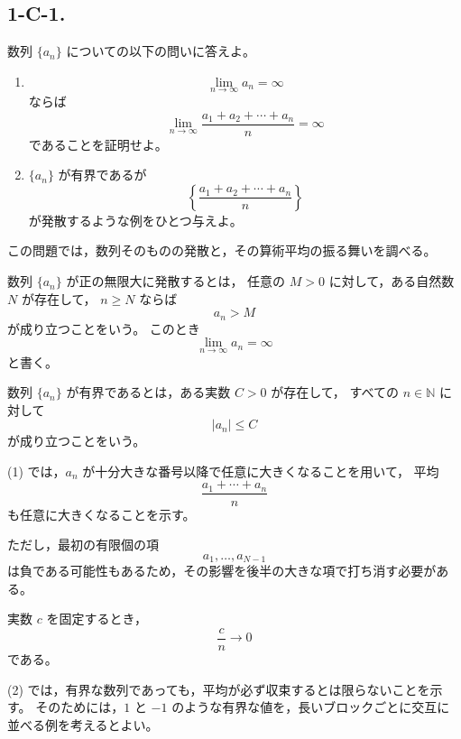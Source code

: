 \subsection{1-C-1.}
\begin{exercise}
    数列 $\{a_n\}$ についての以下の問いに答えよ。

    \begin{enumerate}
        \item
        \[
            \lim_{n\to\infty} a_n=\infty
        \]
        ならば
        \[
            \lim_{n\to\infty}
            \frac{a_1+a_2+\cdots+a_n}{n}
            =\infty
        \]
        であることを証明せよ。

        \item
        $\{a_n\}$ が有界であるが
        \[
            \left\{
                \frac{a_1+a_2+\cdots+a_n}{n}
            \right\}
        \]
        が発散するような例をひとつ与えよ。
    \end{enumerate}
\end{exercise}
\begin{background}
    この問題では，数列そのものの発散と，その算術平均の振る舞いを調べる。

    \begin{definition}[正の無限大への発散]
        数列 $\{a_n\}$ が正の無限大に発散するとは，
        任意の $M>0$ に対して，ある自然数 $N$ が存在して，
        $n\geq N$ ならば
        \[
            a_n>M
        \]
        が成り立つことをいう。
        このとき
        \[
            \lim_{n\to\infty}a_n=\infty
        \]
        と書く。
    \end{definition}

    \begin{definition}[有界な数列]
        数列 $\{a_n\}$ が有界であるとは，ある実数 $C>0$ が存在して，
        すべての $n\in\mathbb{N}$ に対して
        \[
            |a_n|\leq C
        \]
        が成り立つことをいう。
    \end{definition}

    \begin{remark}
    (1) では，$a_n$ が十分大きな番号以降で任意に大きくなることを用いて，
    平均
        \[
            \frac{a_1+\cdots+a_n}{n}
        \]
        も任意に大きくなることを示す。

        ただし，最初の有限個の項
        \[
            a_1,\ldots,a_{N-1}
        \]
        は負である可能性もあるため，その影響を後半の大きな項で打ち消す必要がある。
    \end{remark}

    \begin{lemma}[有限個の和の影響は平均で消える]
        実数 $c$ を固定するとき，
        \[
            \frac{c}{n}\to 0
        \]
        である。
    \end{lemma}

    \begin{remark}
    (2) では，有界な数列であっても，平均が必ず収束するとは限らないことを示す。
        そのためには，$1$ と $-1$ のような有界な値を，長いブロックごとに交互に並べる例を考えるとよい。
    \end{remark}
\end{background}
